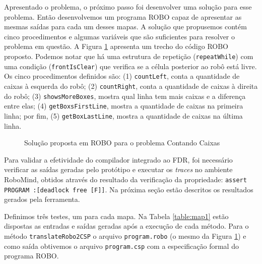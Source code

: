 Apresentado o problema, o próximo passo foi desenvolver uma solução para esse problema. Então desenvolvemos um programa ROBO capaz de apresentar as mesmas saídas para cada um desses mapas. A solução que propusemos contém cinco procedimentos e algumas variáveis que são suficientes para resolver o problema em questão. A Figura \ref{fig:solution} apresenta um trecho do código ROBO proposto. Podemos notar que há uma estrutura de repetição (\texttt{repeatWhile}) com uma condição (\texttt{frontIsClear}) que verifica se a célula posterior ao robô está livre. Os cinco procedimentos definidos são: (1) \texttt{countLeft}, conta a quantidade de caixas à esquerda do robô; (2) \texttt{countRight}, conta a quantidade de caixas à direita do robô; (3) \texttt{showsMoreBoxes}, mostra qual linha tem mais caixas e a diferença entre elas; (4) \texttt{getBoxsFirstLine}, mostra a quantidade de caixas na primeira linha; por fim, (5) \texttt{getBoxLastLine}, mostra a quantidade de caixas na última linha.

\begin{figure}[h]
\centering
\caption{Solução proposta em ROBO para o problema Contando Caixas}

\label{fig:solution}
\end{figure}

Para validar a efetividade do compilador integrado ao FDR, foi necessário verificar as saídas geradas pelo protótipo e executar os \textit{traces} no ambiente RoboMind, obtidos através do resultado da verificação da propriedade: \texttt{assert PROGRAM :[deadlock free [F]]}. Na próxima seção estão descritos os resultados gerados pela ferramenta.

Definimos três testes, um para cada mapa. Na Tabela \ref{table:map1} estão dispostas as entradas e saídas geradas após a execução de cada método. Para o método \texttt{translateRobo2CSP} o arquivo \texttt{program.robo} (o mesmo da Figura \ref{fig:solution}) e  como saída obtivemos o arquivo \texttt{program.csp} com a especificação formal do programa ROBO.

\begin{table}
\caption{Entradas e saídas para o mapa 1}
\label{table:map1}
\end{table}

